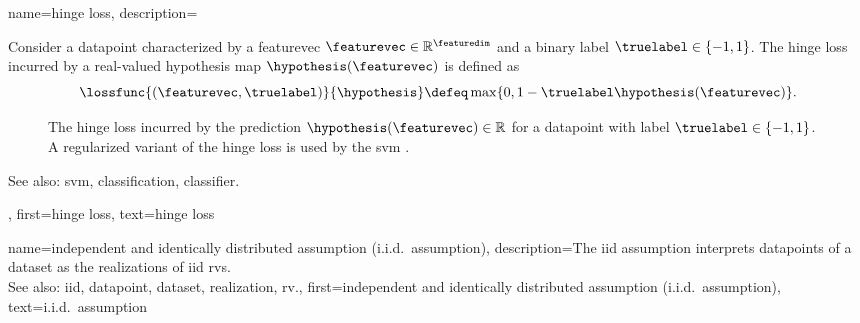 {name={hinge loss}, 
	description={Consider a \gls{datapoint} 
		characterized by a \gls{featurevec} $\featurevec \in \mathbb{R}^{\featuredim}$ and a 
		binary \gls{label} $\truelabel \in \{-1,1\}$. The hinge \gls{loss} incurred by a real-valued 
		\gls{hypothesis} \gls{map} $\hypothesis(\featurevec)$ is defined as 
		\begin{equation} 
			\label{equ_hinge_loss_gls_dict}
				\lossfunc{(\featurevec,\truelabel)}{\hypothesis} \defeq \max \{ 0 , 1 - \truelabel \hypothesis(\featurevec) \}. 
		\end{equation}
		\begin{figure}[H]
		\begin{center}
		\caption{The hinge \gls{loss} incurred by the \gls{prediction} $\hypothesis(\featurevec) \in \mathbb{R}$ 
		for a \gls{datapoint} with \gls{label} $\truelabel \in \{-1,1\}$. A regularized variant of the hinge 
		\gls{loss} is used by the \gls{svm} \cite{LampertNowKernel}.}
		\label{fig_hingeloss_dict}
		\end{center}
		\end{figure} 	    
		See also: \gls{svm}, \gls{classification}, \gls{classifier}.},
	first={hinge loss},
	text={hinge loss}
}

{name={independent and identically distributed assumption (i.i.d.\ assumption)}, 
	description={The \gls{iid} assumption interprets \glspl{datapoint} of a \gls{dataset} as the 
		\glspl{realization} of \gls{iid} \glspl{rv}.
				\\
		See also: \gls{iid}, \gls{datapoint}, \gls{dataset}, \gls{realization}, \gls{rv}.},
	first={independent and identically distributed assumption (i.i.d.\ assumption)},
	text={i.i.d.\ assumption} 
}

